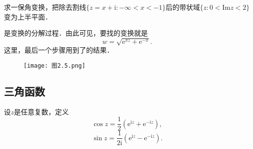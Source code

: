 \documentclass[../../main.tex]{subfiles}
\begin{document}
\begin{example}
求一保角变换，把除去割线$\{ z = x + \text{i}: -\infty < x < -1 \}$后的带状域$\{ z: 0 < \text{Im} z < 2 \}$变为上半平面．
\end{example}
\begin{solution}
是变换的分解过程．由此可见，要找的变换就是
\[
w = \sqrt{\text{e}^{\pi z} + \text{e}^{-\pi}}.
\]
这里，最后一个步骤用到了的结果．
\begin{figure}[H]
\centering
\texttt{[image: 图2.5.png]}
\caption{}
\label{figure:图2.5}
\end{figure}
\end{solution}



\subsection{三角函数}

\begin{definition}
设$z$是任意复数，定义
\[
\cos z = \dfrac{1}{2}(\text{e}^{\text{i}z} + \text{e}^{-\text{i}z}),
\]
\[
\sin z = \dfrac{1}{2\text{i}}(\text{e}^{\text{i}z} - \text{e}^{-\text{i}z}).
\]
\end{definition}
\end{document}
